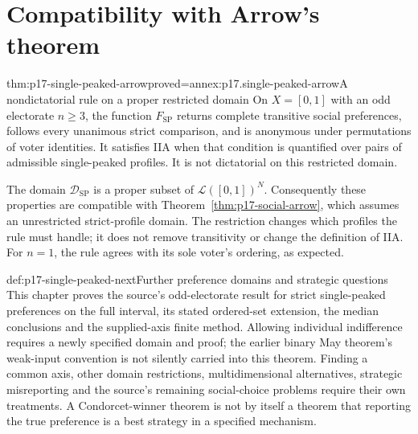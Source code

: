 \section{Compatibility with Arrow's theorem}
\label{sec:p17-single-peaked-arrow}

\begin{hbtheorem}{thm:p17-single-peaked-arrow}{proved=annex:p17.single-peaked-arrow}{A nondictatorial rule on a proper restricted domain}
On \(X=[0,1]\) with an odd electorate \(n\geq3\), the function
\(F_{\mathrm{SP}}\) returns complete transitive social preferences,
follows every unanimous strict comparison, and is anonymous under
permutations of voter identities. It satisfies IIA when that condition
is quantified over pairs of admissible single-peaked profiles. It is
not dictatorial on this restricted domain.

The domain \(\mathcal D_{\mathrm{SP}}\) is a proper subset of
\(\mathcal L([0,1])^N\). Consequently these properties are compatible
with Theorem~\ref{thm:p17-social-arrow}, which assumes an unrestricted
strict-profile domain. The restriction changes which profiles the rule
must handle; it does not remove transitivity or change the definition of IIA.
For \(n=1\), the rule agrees with its sole voter's ordering, as expected.
\end{hbtheorem}

\begin{proofboundary}{def:p17-single-peaked-next}{Further preference domains and strategic questions}
This chapter proves the source's odd-electorate result for strict
single-peaked preferences on the full interval, its stated ordered-set
extension, the median conclusions and the supplied-axis finite method.
Allowing individual indifference requires a newly specified domain and
proof; the earlier binary May theorem's weak-input convention is not
silently carried into this theorem. Finding a common axis, other domain
restrictions, multidimensional alternatives, strategic misreporting and
the source's remaining social-choice problems require their own treatments.
A Condorcet-winner theorem is not by itself a theorem that reporting the
true preference is a best strategy in a specified mechanism.
\end{proofboundary}
